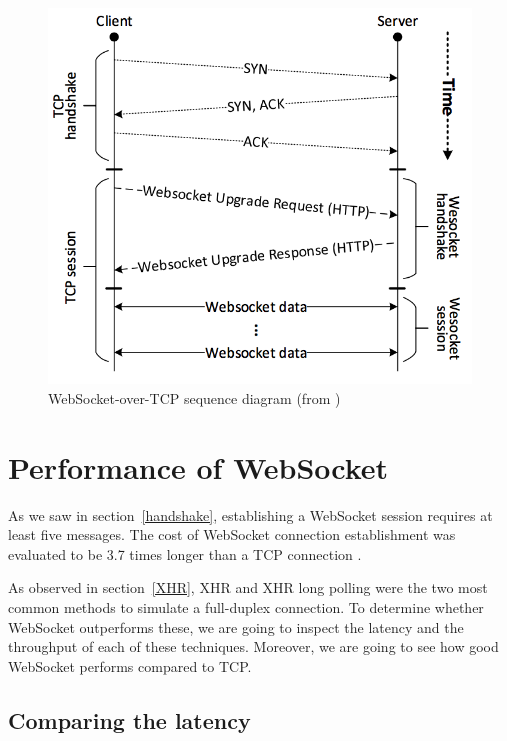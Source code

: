 \documentclass[10pt,journal,compsoc]{IEEEtran}
\newcommand{\ws}{WebSocket}
\begin{document}
\begin{figure}
    \centering
    \includegraphics[width=\linewidth]{websocket_tcp_diagram.png}
    \caption{\ws-over-TCP sequence diagram (from \cite{performanceEvaluationOfWebsocketProtocol})}
    \label{fig:websocket_connection}
\end{figure}


\section{Performance of \ws{}}

As we saw in section~\ref{handshake}, establishing a \ws{} session requires at least five messages.
The cost of \ws{} connection establishment was evaluated to be 3.7 times longer than a TCP connection \cite{performanceEvaluationOfWebsocketProtocol}.  %

As observed in section~\ref{XHR}, XHR and XHR long polling were the two most common methods to simulate a full-duplex connection.
To determine whether \ws{} outperforms these, we are going to inspect the latency and the throughput of each of these techniques.
Moreover, we are going to see how good \ws{} performs compared to TCP. %

\subsection{Comparing the latency}
\end{document}
